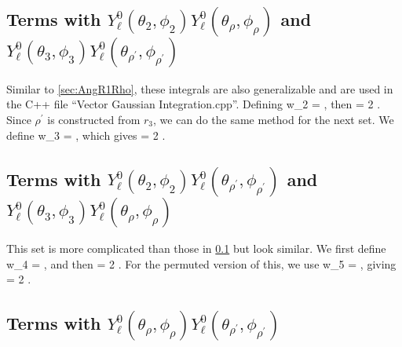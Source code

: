 \documentclass[Dissertation.tex]{subfiles}
\begin{document}
\subsection{Terms with \texorpdfstring{$Y_\ell^0(\theta_2, \phi_2) Y_\ell^0(\theta_{\rho}, \phi_{\rho})$}{Y2-Yrho} and \texorpdfstring{$Y_\ell^0(\theta_3, \phi_3) Y_\ell^0(\theta_{\rho^\prime}, \phi_{\rho^\prime})$}{Y3-Yrho'}}
\label{sec:AngR2Rho}

Similar to \cref{sec:AngR1Rho}, these integrals are also generalizable and are used in the C++ file ``Vector Gaussian Integration.cpp''. Defining
\beq
w_2 = ,
\eeq
then
\beq
{} = 2 \pi {}.
\eeq
Since $\rho^\prime$ is constructed from $r_3$, we can do the same method for the next set. We define
\beq
w_3 = ,
\eeq
which gives
\beq
{} = 2 \pi {}.
\eeq


\subsection{Terms with \texorpdfstring{$Y_\ell^0(\theta_2, \phi_2) Y_\ell^0(\theta_{\rho^\prime}, \phi_{\rho^\prime})$}{Y2-Yrho'} and \texorpdfstring{$Y_\ell^0(\theta_3, \phi_3) Y_\ell^0(\theta_{\rho}, \phi_{\rho})$}{Y3-Yrho}}
\label{sec:AngR2Rhop}

This set is more complicated than those in \cref{sec:AngR2Rho} but look similar. We first define
\beq
w_4 = ,
\eeq
and then
\beq
{} = 2 \pi {}.
\eeq
For the permuted version of this, we use
\beq
w_5 = ,
\eeq
giving
\beq
{} = 2 \pi {}.
\eeq
{}


\subsection{Terms with \texorpdfstring{$Y_\ell^0(\theta_\rho, \phi_\rho) Y_\ell^0(\theta_{\rho^\prime}, \phi_{\rho^\prime})$}{Yrho-Yrho'}}
\end{document}
